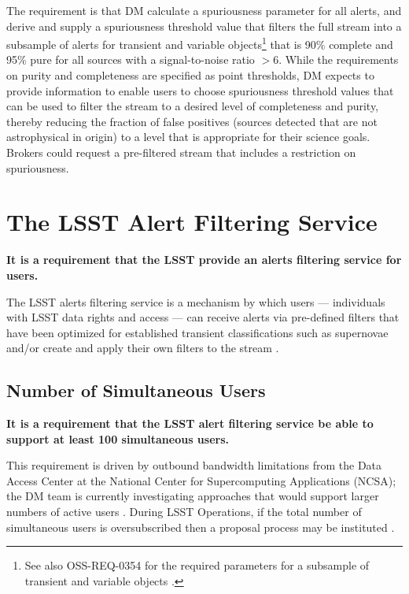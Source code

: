 \documentclass[DM,authoryear,toc]{lsstdoc}
\begin{document}
The requirement is that \gls{DM} calculate a spuriousness parameter for all alerts, and derive and supply a spuriousness threshold value that filters the full stream into a subsample of alerts for \gls{transient} and variable objects\footnote{See also \gls{OSS}-REQ-0354 for the required parameters for a subsample of \gls{transient} and variable objects .} that is 90\% complete and 95\% pure for all sources with a signal-to-noise ratio $>$6. While the requirements on purity and completeness are specified as point thresholds, \gls{DM} expects to provide information to enable users to choose spuriousness threshold values that can be used to filter the stream to a desired level of completeness and purity, thereby reducing the fraction of false positives (sources detected that are not astrophysical in origin) to a level that is appropriate for their science goals. Brokers could request a pre-filtered stream that includes a restriction on spuriousness.


\section{The \gls{LSST} Alert Filtering Service} \label{sec:LAFS}

{\bf It is a requirement that the \gls{LSST} provide an alerts filtering service for users.}

The \gls{LSST} alerts filtering service is a mechanism by which users --- individuals with \gls{LSST} data rights and access --- can receive alerts via pre-defined filters that have been optimized for established \gls{transient} classifications such as supernovae and/or create and apply their own filters to the stream .


\subsection{Number of Simultaneous Users}\label{ssec:LAFS_users}

{\bf It is a requirement that the \gls{LSST} alert filtering service be able to support at least 100 simultaneous users.}

This requirement is driven by outbound bandwidth limitations from the Data Access \gls{Center} at the National \gls{Center} for Supercomputing Applications (\gls{NCSA}); the \gls{DM} team is currently investigating approaches that would support larger numbers of active users . During \gls{LSST} \gls{Operations}, if the total number of simultaneous users is oversubscribed then a proposal process may be instituted .
\end{document}
